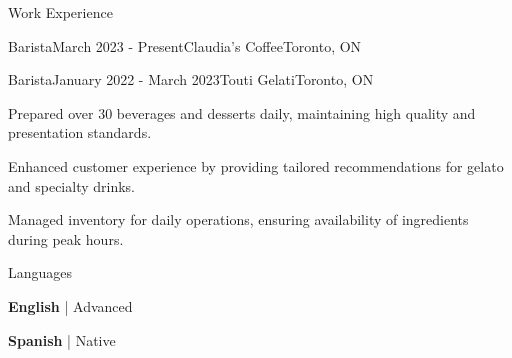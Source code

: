\documentclass[11pt]{resume} %
\begin{document}
\newpage


\begin{rSection}{Work Experience}

	\begin{rSubsection}{Barista}{March 2023 - Present}{Claudia's Coffee}{Toronto, ON}

	\end{rSubsection}


	\begin{rSubsection}{Barista}{January 2022 - March 2023}{Touti Gelati}{Toronto, ON}
		\item Prepared over 30 beverages and desserts daily, maintaining high quality and presentation standards.
		\item Enhanced customer experience by providing tailored recommendations for gelato and specialty drinks.
		\item Managed inventory for daily operations, ensuring availability of ingredients during peak hours.
	\end{rSubsection}


\end{rSection}


\begin{rSection}{Languages}
	\begin{rSubsection}{}{}{}{}
		\item \textbf{English} | Advanced
		\item \textbf{Spanish} | Native
	\end{rSubsection}
\end{rSection}

\end{document}
